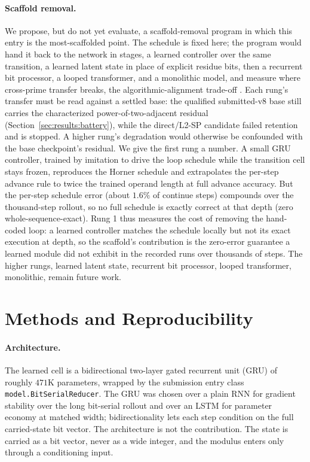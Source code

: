 \documentclass[11pt]{article}
\begin{document}
\paragraph{Scaffold removal.}
We propose, but do not yet evaluate, a scaffold-removal program in which this entry is
the most-scaffolded point. The schedule is fixed here; the program would hand it back to
the network in stages, a learned controller over the same transition, a learned
latent state in place of explicit residue bits, then a recurrent bit processor, a looped
transformer, and a monolithic model, and measure where cross-prime transfer breaks,
the algorithmic-alignment trade-off \citep{velickovic2021nar, bohde2024markov}. Each
rung's transfer must be read against a settled base: the qualified submitted-v8
base still carries the characterized power-of-two-adjacent residual
(Section~\ref{sec:results:battery}), while the direct/L2-SP candidate failed
retention and is stopped. A higher rung's degradation would otherwise be confounded with the
base checkpoint's residual. We give the first rung a number. A small GRU controller, trained by imitation to drive
the loop schedule while the transition cell stays frozen, reproduces the Horner schedule
and extrapolates the per-step advance rule to twice the trained operand length at full
advance accuracy. But the per-step schedule error (about $1.6\%$ of continue steps)
compounds over the thousand-step rollout, so no full schedule is exactly correct at that
depth (zero whole-sequence-exact). Rung 1 thus measures the cost of removing the
hand-coded loop: a learned controller matches the schedule locally but not its exact
execution at depth, so the scaffold's contribution is the zero-error guarantee a learned
module did not exhibit in the recorded runs over thousands of steps. The higher rungs, learned latent state,
recurrent bit processor, looped transformer, monolithic, remain future work.

\appendix

\section{Methods and Reproducibility}
\label{app:repro}

\paragraph{Architecture.}
The learned cell is a bidirectional two-layer gated recurrent unit (GRU) of roughly
$471$K parameters, wrapped by the submission entry class
\texttt{model.BitSerialReducer}. The GRU was chosen over a plain RNN for gradient
stability over the long bit-serial rollout and over an LSTM for parameter economy
at matched width; bidirectionality lets each step condition on the full
carried-state bit vector. The architecture is not the contribution. The state is
carried as a bit vector, never as a wide integer, and the modulus enters only
through a conditioning input.
\end{document}
